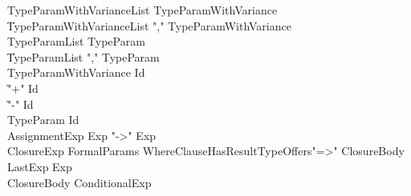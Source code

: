 \begin{grammar}
 TypeParamWithVarianceList  \:   TypeParamWithVariance\\
    \|   TypeParamWithVarianceList  \xcd","  TypeParamWithVariance\\
 TypeParamList  \:   TypeParam\\
    \|   TypeParamList  \xcd","  TypeParam\\
 TypeParamWithVariance  \:   Id\\
    \|   \xcd"+"  Id\\
    \|   \xcd"-"  Id\\
 TypeParam  \:   Id\\
 AssignmentExp  \:   Exp    \xcd"->"  Exp  \\
 ClosureExp  \:   FormalParams  WhereClause\opt  HasResultType\opt  Offers\opt  \xcd"=>"  ClosureBody\\
 LastExp  \:   Exp\\
 ClosureBody  \:   ConditionalExp\\
\end{grammar}

